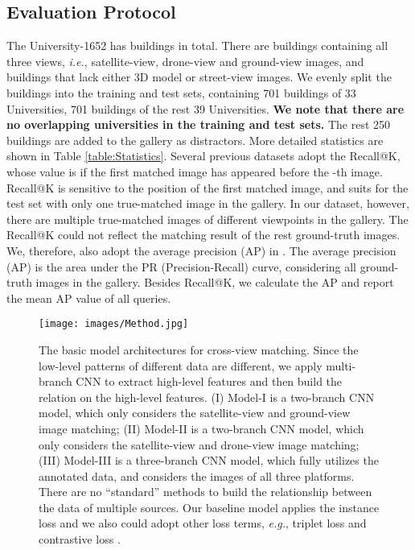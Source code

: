 \documentclass[sigconf]{acmart}
\def\eg{\emph{e.g.}}
\def\ie{\emph{i.e.}}
\begin{document}
\subsection{Evaluation Protocol}
The University-1652 has  buildings in total. There are  buildings containing all three views, \ie, satellite-view, drone-view and ground-view images, and  buildings that lack either 3D model or street-view images. We evenly split the  buildings into the training and test sets, containing 701 buildings of 33 Universities, 701 buildings of the rest 39 Universities. \textbf{We note that there are no overlapping universities in the training and test sets.} The rest 250 buildings are added to the gallery as distractors. More detailed statistics are shown in Table \ref{table:Statistics}. Several previous datasets \cite{liu2019lending,zhai2017predicting,vo2016localizing} adopt the Recall@K, whose value is  if the first matched image has appeared before the -th image. Recall@K is sensitive to the position of the first matched image, and suits for the test set with only one true-matched image in the gallery. In our dataset, however, there are multiple true-matched images of different viewpoints in the gallery. The Recall@K could not reflect the matching result of the rest ground-truth images. We, therefore, also adopt the average precision (AP) in \cite{lin2015learning,tian2017cross}. The average precision (AP) is the area under the PR (Precision-Recall) curve, considering all ground-truth images in the gallery. Besides Recall@K, we calculate the AP and report the mean AP value of all queries. 

\begin{figure}[t]
\begin{center}
     \texttt{[image: images/Method.jpg]}
\end{center}
\vspace{-.2in}
      \caption{ The basic model architectures for cross-view matching. Since the low-level patterns of different data are different, we apply multi-branch CNN to extract high-level features and then build the relation on the high-level features. (I) Model-I is a two-branch CNN model, which only considers the satellite-view and ground-view image matching; (II) Model-II is a two-branch CNN model, which only considers the satellite-view and drone-view image matching; (III) Model-III is a three-branch CNN model, which fully utilizes the annotated data, and considers the images of all three platforms. There are no ``standard'' methods to build the relationship between the data of multiple sources. Our baseline model applies the instance loss \cite{zheng2017dual} and we also could adopt other loss terms, \eg, triplet loss \cite{chechik2010large,deng2018triplet} and contrastive loss \cite{lin2015learning,workman2015wide,zheng2016discriminatively}.
      }\label{fig:method}
\end{figure}
\end{document}
